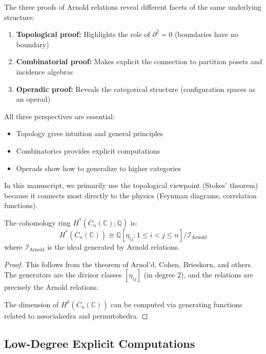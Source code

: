 \begin{remark}\label{rem:three-proofs-one}
The three proofs of Arnold relations reveal different facets of the same underlying structure:

\begin{enumerate}
\item \textbf{Topological proof:} Highlights the role of $\partial^2 = 0$ (boundaries have no boundary)
\item \textbf{Combinatorial proof:} Makes explicit the connection to partition posets and incidence algebras
\item \textbf{Operadic proof:} Reveals the categorical structure (configuration spaces as an operad)
\end{enumerate}

All three perspectives are essential:
\begin{itemize}
\item Topology gives intuition and general principles
\item Combinatorics provides explicit computations
\item Operads show how to generalize to higher categories
\end{itemize}

In this manuscript, we primarily use the topological viewpoint (Stokes' theorem) because it connects most directly to the physics (Feynman diagrams, correlation functions).
\end{remark}

\begin{corollary}\label{cor:cohomology-config}
The cohomology ring $H^*(\overline{C}_n(\mathbb{C}); \mathbb{Q})$ is:
$$H^*(\overline{C}_n(\mathbb{C})) \cong \mathbb{Q}[\eta_{ij} : 1 \leq i < j \leq n] / \mathcal{I}_{\text{Arnold}}$$
where $\mathcal{I}_{\text{Arnold}}$ is the ideal generated by Arnold relations.
\end{corollary}

\begin{proof}
This follows from the theorem of Arnol'd, Cohen, Brieskorn, and others. The generators are the divisor classes $[\eta_{ij}]$ (in degree 2), and the relations are precisely the Arnold relations.

The dimension of $H^k(\overline{C}_n(\mathbb{C}))$ can be computed via generating functions related to associahedra and permutohedra.
\end{proof}

\subsection{Low-Degree Explicit Computations}

